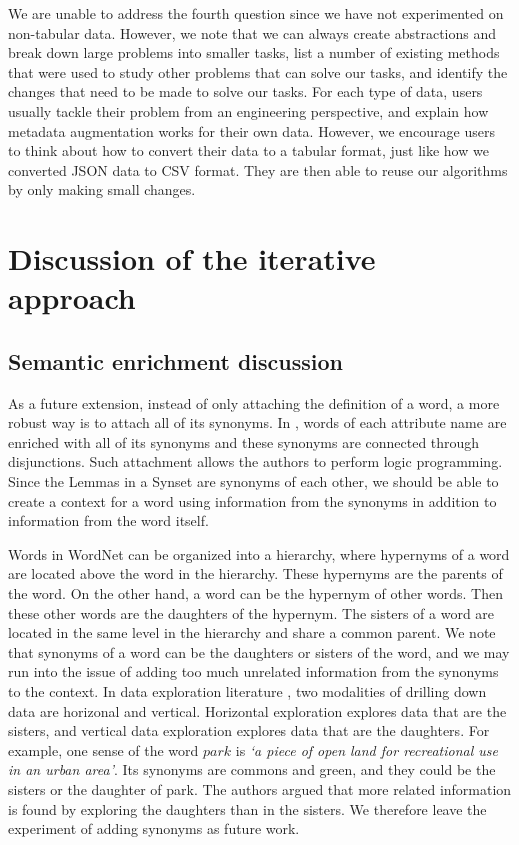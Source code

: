 We are unable to address the fourth question since we have not experimented on non-tabular data. However, we note that we can always create abstractions and break down large problems into smaller tasks, list a number of existing methods that were used to study other problems that can solve our tasks, and identify the changes that need to be made to solve our tasks. For each type of data, users usually tackle their problem from an engineering perspective, and explain how metadata augmentation works for their own data. However, we encourage users to think about how to convert their data to a tabular format, just like how we converted JSON data to CSV format. They are then able to reuse our algorithms by only making small changes.

\section{Discussion of the iterative approach}
\label{sec:DiscussionOfTheIterativeApproach}

\subsection{Semantic enrichment discussion}

As a future extension, instead of only attaching the definition of a word, a more robust way is to attach all of its synonyms. In \cite{Giunchiglia2005Semantic}, words of each attribute name are enriched with all of its synonyms and these synonyms are connected through disjunctions. Such attachment allows the authors to perform logic programming. Since the Lemmas in a Synset are synonyms of each other, we should be able to create a context for a word using information from the synonyms in addition to information from the word itself.

Words in WordNet can be organized into a hierarchy, where hypernyms of a word are located above the word in the hierarchy. These hypernyms are the parents of the word. On the other hand, a word can be the hypernym of other words. Then these other words are the daughters of the hypernym. The sisters of a word are located in the same level in the hierarchy and share a common parent. We note that synonyms of a word can be the daughters or sisters of the word, and we may run into the issue of adding too much unrelated information from the synonyms to the context. In data exploration literature \cite{10.14778/3021924.3021935}, two modalities of drilling down data are horizonal and vertical. Horizontal exploration explores data that are the sisters, and vertical data exploration explores data that are the daughters. For example, one sense of the word $park$ is \textit{`a piece of open land for recreational use in an urban area'}. Its synonyms are commons and green, and they could be the sisters or the daughter of park. The authors argued that more related information is found by exploring the daughters than in the sisters. We therefore leave the experiment of adding synonyms as future work.


